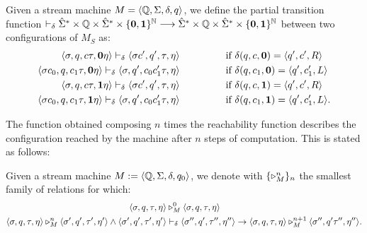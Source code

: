 \begin{conditional}{\notappendix}
    \begin{defn}
    Given a stream machine $M=\langle \mathbb{Q},
    \Sigma, \delta, q\rangle$,
    we define the partial transition function
    $\vdash_{\delta} \hat{\Sigma}^* \times \mathbb{Q}
    \times \hat{\Sigma}^* \times \{\mathbf{0},
    \mathbf{1}\}^{\mathbb{N}} \longrightarrow \hat{\Sigma}^*
    \times \mathbb{Q} \times \hat{\Sigma}^* \times \{\mathbf{0},
    \mathbf{1}\}^{\mathbb{N}}$
    between two configurations of $M_S$ as:
    \begin{align*}
    \langle \sigma, q, c\tau, \mathbf{0} \eta\rangle
    \vdash_{\delta} \langle\sigma c', q', \tau, \eta\rangle
    \ \ \ \ \ \ \ \ \ \ \ \ \ &\text{ if }
    \delta (q,c,\mathbf{0})
    = \langle q',c',R\rangle
    \\
    \langle \sigma c_0, q, c_1\tau, \mathbf{0}
    \eta\rangle
    \vdash_{\delta} \langle \sigma, q', c_0c_1'\tau,
    \eta\rangle
     \ \ \ \ \ \ \ \ \ \ \ \ \ &\text{ if }
    \delta (q, c_1,\mathbf{0})
    = \langle q', c_1', L\rangle  \\
    \langle \sigma, q, c\tau, \mathbf{1} \eta\rangle
    \vdash_{\delta}
    \langle \sigma c', q', \tau, \eta\rangle
     \ \ \ \ \ \ \ \ \ \ \ \ \ &\text{ if }
     \delta(q, c, \mathbf{1})=
     \langle q', c', R\rangle \\
     \langle \sigma c_0, q, c_1\tau,
     \mathbf{1}\eta\rangle
     \vdash_{\delta} \langle \sigma,
     q', c_0c_1' \tau, \eta \rangle
      \ \ \ \ \ \ \ \ \ \ \ \ \ &\text{ if }
     \delta(q, c_1,\mathbf{1})
     = \langle q',c_1', L\rangle.
    \end{align*}
    \end{defn}

    The function obtained composing $n$ times the reachability
    function describes the configuration reached by the machine after $n$
    steps of computation. This is stated as follows:



    \begin{defn}
    Given a stream machine $M:=\langle \mathbb{Q},
    \Sigma, \delta, q_0\rangle$,
    we denote with $\{\triangleright^{n}_{M}\}_n$
    the smallest family of relations
    for which:
    \begin{align*}
    \langle \sigma, q, \tau, \eta \rangle
    &\triangleright^{0}_{M}
    \langle \sigma, q, \tau, \eta\rangle \\
    \langle \sigma, q, \tau, \eta\rangle
    \triangleright^{n}_{M} \langle \sigma',
    q', \tau',\eta'\rangle
    \wedge \langle \sigma', q',
    \tau', \eta'\rangle
    &\vdash_{\delta}
    \langle \sigma'', q', \tau'',
    \eta'' \rangle \rightarrow
    \langle \sigma,q,\tau, \eta\rangle
    \triangleright^{n+1}_{M}\langle
    \sigma'', q'\tau'',\eta''\rangle.
    \end{align*}
    \end{defn}


\end{conditional}

